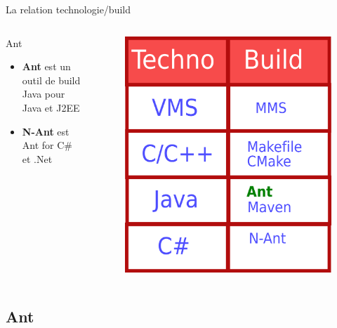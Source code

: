 \documentclass[handout]{beamer}
\begin{document}
\begin{frame}
 	\begin{block}{La relation technologie/build}
 	\end{block}
	\begin{columns}
		\begin{block}{Ant}
			\begin{itemize}
				\item \textbf{Ant} est un outil de build Java pour Java et J2EE 
				\item \textbf{N-Ant} est Ant for C{\#} et .Net
			\end{itemize}
		\end{block}
		\begin{figure}[hbtp]
			\includegraphics[scale=0.3]{../img/techno-build.png}
		\end{figure}
	\end{columns}
\end{frame}
\subsection{Ant}
\end{document}
